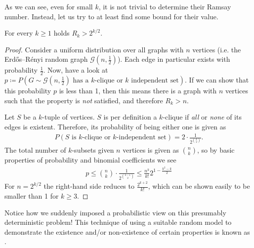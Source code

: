 As we can see, even for small $k$, it is not trivial to determine their Ramsay number.
Instead, let us try to at least find some bound for their value.
\begin{theorem}
    For every $k \geq 1$ holds $R_k > 2^{k/2}$.
\end{theorem}
\begin{proof}
    Consider a uniform distribution over all graphs with $n$ vertices (i.e. the Erdős–Rényi random graph $\mathcal{G}(n, \frac{1}{2})$).
    Each edge in particular exists with probability $\frac{1}{2}$.
    Now, have a look at $p \coloneqq P(G \sim \mathcal{G}(n, \frac{1}{2}) \text{ has a $k$-clique or $k$ independent set})$.
    If we can show that this probability $p$ is less than 1, then this means there is a graph with $n$ vertices such that the property is \emph{not} satisfied,
    and therefore $R_k > n$.

    Let $S$ be a $k$-tuple of vertices. $S$ is per definition a $k$-clique if \emph{all} or \emph{none} of its edges is existent.
    Therefore, its probability of being either one is given as
    \begin{align}
        P(S \text{ is $k$-clique or $k$-independent set}) = 2 \cdot \frac{1}{2^{\binom{k}{2}}}.
    \end{align}
    The total number of $k$-subsets given $n$ vertices is given as $\binom{n}{k}$, so by basic properties of probability 
    and binomial coefficients we see
    \begin{align}
        p \leq \binom{n}{k} \cdot \frac{1}{2^{\binom{k-1}{2}}} \leq \frac{n^k}{k!} 2^{1-\frac{k^2-k}{2}} 
    \end{align}
    For $n = 2^{k/2}$ the right-hand side reduces to $\frac{2^{k+2}}{k!}$, which can be shown easily to be smaller than 1 for $k \geq 3$. 
\end{proof}
Notice how we suddenly imposed a probabilistic view on this presumably deterministic problem!
This technique of using a suitable random model to demonstrate the existence and/or non-existence of certain properties
is known as .

